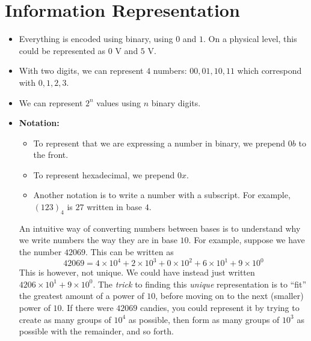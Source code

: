 \section{Information Representation}
\begin{itemize}
    \item Everything is encoded using binary, using $0$ and $1$. On a physical level, this could be represented as $0\text{ V}$ and $5\text{ V}$.
    \item With two digits, we can represent $4$ numbers: $00,01,10,11$ which correspond with $0,1,2,3$.
    \item We can represent $2^n$ values using $n$ binary digits.
    \item \textbf{Notation:}
    \begin{itemize}
        \item To represent that we are expressing a number in binary, we prepend $0b$ to the front.
        \item To represent hexadecimal, we prepend $0x$.
        \item Another notation is to write a number with a subscript. For example, $(123)_4$ is $27$ written in base $4$.
    \end{itemize}
    \begin{idea}
        An intuitive way of converting numbers between bases is to understand why we write numbers the way they are in base $10$. For example, suppose we have the number $42069$. This can be written as
        \begin{equation}
            42069 = 4 \times 10^4 + 2 \times 10^3 + 0 \times 10^2 + 6 \times 10^1 + 9 \times 10^0
        \end{equation}
        This is however, not unique. We could have instead just written $4206 \times 10^1 + 9\times 10^0$. The \textit{trick} to finding this \textit{unique} representation is to ``fit'' the greatest amount of a power of $10$, before moving on to the next (smaller) power of $10$. If there were $42069$ candies, you could represent it by trying to create as many groups of $10^4$ as possible, then form as many groups of $10^3$ as possible with the remainder, and so forth.
        \vspace{2mm}


\end{idea}
\end{itemize}
